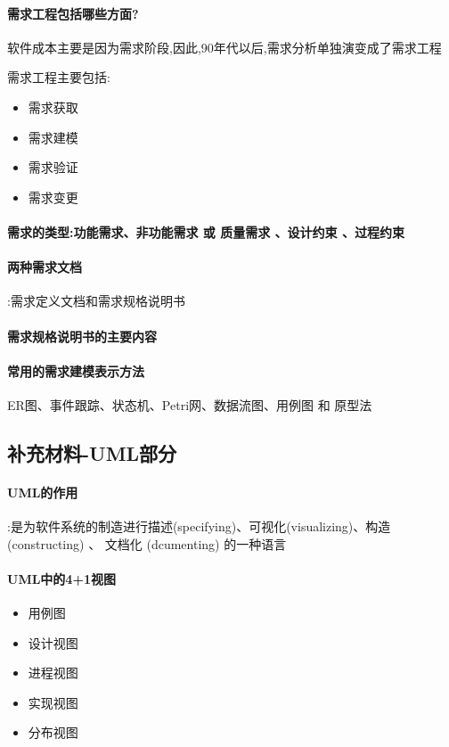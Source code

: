 \documentclass[UTF8,a4paper]{ctexart}
\begin{document}
\paragraph{需求工程包括哪些方面?}
软件成本主要是因为需求阶段,因此,90年代以后,需求分析单独演变成了需求工程

需求工程主要包括:
\begin{itemize}
  \item 需求获取
  \item 需求建模
  \item 需求验证
  \item 需求变更
\end{itemize}

\paragraph{需求的类型:功能需求、非功能需求 或 质量需求 、设计约束 、过程约束}

\paragraph{两种需求文档}:需求定义文档和需求规格说明书

\paragraph{需求规格说明书的主要内容}

\paragraph{常用的需求建模表示方法}ER图、事件跟踪、状态机、Petri网、数据流图、用例图 和 原型法

\subsection{补充材料-UML部分}

\paragraph{UML的作用}:是为软件系统的制造进行描述(specifying)、可视化(visualizing)、构造(constructing) 、 文档化 (dcumenting) 的一种语言

\paragraph{UML中的4+1视图}
\begin{itemize}
  \item 用例图
  \item 设计视图
  \item 进程视图
  \item 实现视图
  \item 分布视图
\end{itemize}
\end{document}
